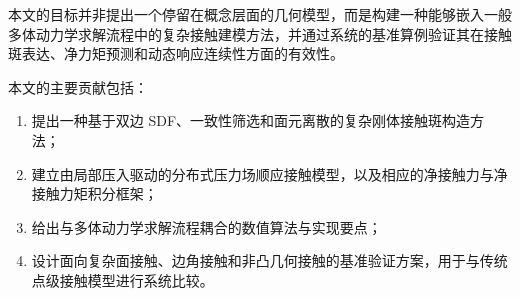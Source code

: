 本文的目标并非提出一个停留在概念层面的几何模型，而是构建一种能够嵌入一般多体动力学求解流程中的复杂接触建模方法，并通过系统的基准算例验证其在接触斑表达、净力矩预测和动态响应连续性方面的有效性。

本文的主要贡献包括：
\begin{enumerate}[label=(\arabic*)]
    \item 提出一种基于双边 SDF、一致性筛选和面元离散的复杂刚体接触斑构造方法；
    \item 建立由局部压入驱动的分布式压力场顺应接触模型，以及相应的净接触力与净接触力矩积分框架；
    \item 给出与多体动力学求解流程耦合的数值算法与实现要点；
    \item 设计面向复杂面接触、边角接触和非凸几何接触的基准验证方案，用于与传统点级接触模型进行系统比较。
\end{enumerate}
